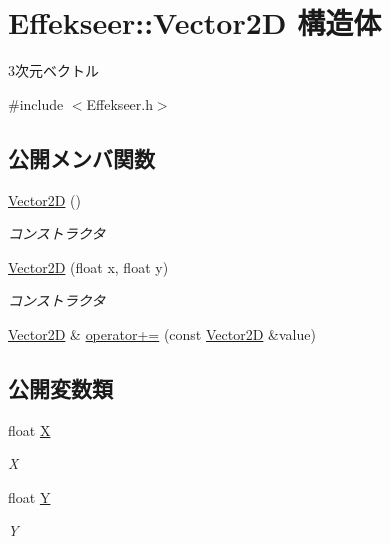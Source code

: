 \hypertarget{struct_effekseer_1_1_vector2_d}{}\section{Effekseer\+:\+:Vector2D 構造体}
\label{struct_effekseer_1_1_vector2_d}


3次元ベクトル  




{\ttfamily \#include $<$Effekseer.\+h$>$}

\subsection*{公開メンバ関数}
\begin{DoxyCompactItemize}
\item 
\mbox{\hyperlink{struct_effekseer_1_1_vector2_d_ad8fd715dce59a571b4cc703373379bbb}{Vector2D}} ()
\begin{DoxyCompactList}\small\item\em コンストラクタ \end{DoxyCompactList}\item 
\mbox{\hyperlink{struct_effekseer_1_1_vector2_d_ac082caa301aa59fd14a1c3793d3bf29e}{Vector2D}} (float x, float y)
\begin{DoxyCompactList}\small\item\em コンストラクタ \end{DoxyCompactList}\item 
\mbox{\hyperlink{struct_effekseer_1_1_vector2_d}{Vector2D}} \& \mbox{\hyperlink{struct_effekseer_1_1_vector2_d_aa86968d06d78c0a951e85f6a44b02f95}{operator+=}} (const \mbox{\hyperlink{struct_effekseer_1_1_vector2_d}{Vector2D}} \&value)
\end{DoxyCompactItemize}
\subsection*{公開変数類}
\begin{DoxyCompactItemize}
\item 
float \mbox{\hyperlink{struct_effekseer_1_1_vector2_d_ae84928d10dd54136f362361aad8fe4aa}{X}}
\begin{DoxyCompactList}\small\item\em X \end{DoxyCompactList}\item 
float \mbox{\hyperlink{struct_effekseer_1_1_vector2_d_a648a6d6b86aaaeadc2302ae99d2d2768}{Y}}
\begin{DoxyCompactList}\small\item\em Y \end{DoxyCompactList}\end{DoxyCompactItemize}


